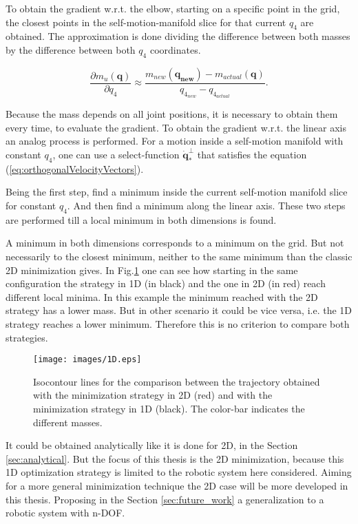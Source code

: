 To obtain the gradient w.r.t. the elbow, starting on a specific point in the grid, the closest points in the self-motion-manifold slice for that current $q_4$ are obtained. The approximation is done dividing the difference between both  masses by the difference between both $q_4$ coordinates. 



\begin{equation}
\frac{\partial {m_u(\mathbf{q})}}{\partial {q_4}} \approx \frac{m_{new}(\mathbf{q_{new}}) - m_{actual}(\mathbf{q})}{ q_{4_{new}} - q_{4_{actual}}}.
\label{eq:approx_grad_q4}
\end{equation}



Because the mass depends on all joint positions, it is necessary to obtain them every time, to evaluate the gradient. To obtain the gradient w.r.t. the linear axis an analog process is performed. For a motion inside a self-motion manifold with constant $q_4$, one can use a select-function $\dot{\mathbf{q}}_*^{\bot}$ that satisfies the equation (\ref{eq:orthogonalVelocityVectors}).




Being the first step, find a minimum inside the current self-motion manifold slice for constant $q_4$. And then find a minimum along the linear axis. These two steps are performed till a local minimum in both dimensions is found.

A minimum in both dimensions corresponds to a minimum on the grid. But not necessarily to the closest minimum, neither to the same minimum than the classic 2D minimization gives. In  Fig.\ref{fig:1D} one can see how starting in the same configuration the strategy in 1D (in black) and the one in 2D (in red) reach different local minima. In this example the minimum reached with the 2D strategy has a lower mass. But in other scenario it could be vice versa, i.e. the 1D strategy reaches a lower minimum. 	Therefore this is no criterion to compare both strategies.

\begin{figure}[!htb]
	\centerline{
		\texttt{[image: images/1D.eps]}}
	\caption{Isocontour lines for the comparison between the trajectory obtained with the minimization strategy in 2D (red) and with the minimization strategy in 1D (black). The color-bar indicates the different masses.}
	\label{fig:1D}
\end{figure}


It could be obtained analytically like it is done for 2D, in the Section \ref{sec:analytical}. But the focus of this thesis is the 2D minimization, because this 1D optimization strategy is limited to the robotic system here considered. Aiming for a more general minimization technique the 2D case will be more developed in this thesis. Proposing in the Section \ref{sec:future_work} a generalization to a robotic system with n-DOF.

